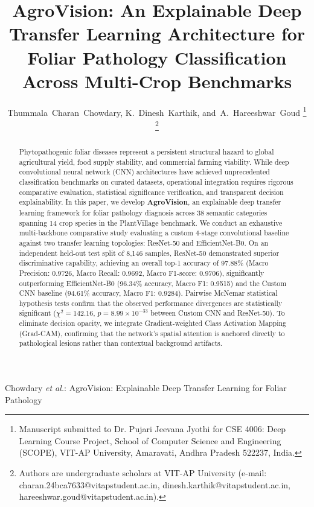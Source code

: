 \documentclass[journal]{IEEEtran}
\begin{document}
\title{AgroVision: An Explainable Deep Transfer Learning Architecture for Foliar Pathology Classification Across Multi-Crop Benchmarks}

\author{Thummala~Charan~Chowdary,
        K.~Dinesh~Karthik,
        and~A.~Hareeshwar~Goud%
\thanks{Manuscript submitted to Dr. Pujari Jeevana Jyothi for CSE 4006: Deep Learning Course Project, School of Computer Science and Engineering (SCOPE), VIT-AP University, Amaravati, Andhra Pradesh 522237, India.}%
\thanks{Authors are undergraduate scholars at VIT-AP University (e-mail: charan.24bca7633@vitapstudent.ac.in, dinesh.karthik@vitapstudent.ac.in, hareeshwar.goud@vitapstudent.ac.in).}}

%
{Chowdary \MakeLowercase{\textit{et al.}}: AgroVision: Explainable Deep Transfer Learning for Foliar Pathology}

\maketitle

\begin{abstract}
Phytopathogenic foliar diseases represent a persistent structural hazard to global agricultural yield, food supply stability, and commercial farming viability. While deep convolutional neural network (CNN) architectures have achieved unprecedented classification benchmarks on curated datasets, operational integration requires rigorous comparative evaluation, statistical significance verification, and transparent decision explainability. In this paper, we develop \textbf{AgroVision}, an explainable deep transfer learning framework for foliar pathology diagnosis across 38 semantic categories spanning 14 crop species in the PlantVillage benchmark. We conduct an exhaustive multi-backbone comparative study evaluating a custom 4-stage convolutional baseline against two transfer learning topologies: ResNet-50 and EfficientNet-B0. On an independent held-out test split of 8,146 samples, ResNet-50 demonstrated superior discriminative capability, achieving an overall top-1 accuracy of 97.88\% (Macro Precision: 0.9726, Macro Recall: 0.9692, Macro F1-score: 0.9706), significantly outperforming EfficientNet-B0 (96.34\% accuracy, Macro F1: 0.9515) and the Custom CNN baseline (94.61\% accuracy, Macro F1: 0.9284). Pairwise McNemar statistical hypothesis tests confirm that the observed performance divergences are statistically significant ($\chi^2 = 142.16$, $p = 8.99 \times 10^{-33}$ between Custom CNN and ResNet-50). To eliminate decision opacity, we integrate Gradient-weighted Class Activation Mapping (Grad-CAM), confirming that the network's spatial attention is anchored directly to pathological lesions rather than contextual background artifacts.
\end{abstract}
\end{document}
